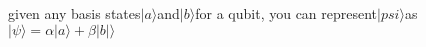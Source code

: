\documentclass[preview]{standalone}
\begin{document}
\begin{center}
given any basis states$|a\rangle$and$|b\rangle$for a qubit, you can represent$|psi\rangle$as$|\psi\rangle=\alpha|a\rangle+\beta|b|\rangle$
\end{center}
\end{document}
